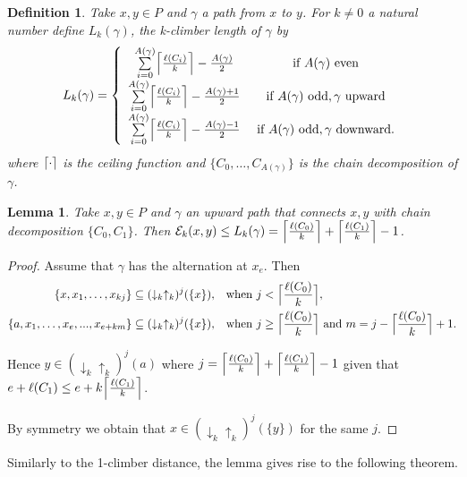 \documentclass{article}[12pt]
\theoremstyle{exampstyle}
\newtheorem{definition}[theorem]{Definition}
\newtheorem{lemma}[theorem]{Lemma}
\theoremstyle{remark}
\newcommand{\E}{\mathcal{E}}
\newcommand{\updown}[1][]{\downarrow_{#1} \uparrow_{#1}}
\DeclarePairedDelimiter{\ceil}{\lceil}{\rceil}
\newcommand{\myceil}[2][k]{\ceil[\Big]{\frac{#2 }{#1}}}
\newcommand{\tuple}[3][1]{#2_{#1}, \dots , #2_{#3}}
\begin{document}
\begin{definition}
    Take $x,y \in P$ and $\gamma$ a path from $x$ to $y$. For $k \neq 0$ a natural number define $L_k(\gamma)$, the \textit{k-climber length} of $\gamma$ by 
    \begin{equation*}
        L_k(\gamma) = \left\{ 
        \begin{array}{cc}
            \sum\limits_{i=0}^{A(\gamma)} \myceil{\ell(C_i)}- \frac{A(\gamma)}{2} &  \text{ if } A(\gamma) \text{ even} \\
            \sum\limits_{i=0}^{A(\gamma)} \myceil{\ell(C_i)}- \frac{A(\gamma)+1}{2} &  \text{ if } A(\gamma) \text{ odd}, \gamma \text{ upward}\\
            \sum\limits_{i=0}^{A(\gamma)} \myceil{\ell(C_i)}- \frac{A(\gamma)-1}{2} &  \text{ if } A(\gamma) \text{ odd}, \gamma \text{ downward}.\\
        \end{array}
        \right.
    \end{equation*}
    where $\ceil{\cdot}$ is the ceiling function and $\{\tuple[0]{C}{A(\gamma)}\}$ is the chain decomposition of $\gamma$.
\end{definition}

\begin{lemma}
    Take $x,y \in P $ and $\gamma$ an upward path that connects $x,y$ with chain decomposition $\{C_0,C_1\}$. Then $\E_k(x,y) \leq L_k({\gamma}) = \myceil{\ell(C_0)} + \myceil{\ell(C_1)} -  1$. 
    \label{lemma_k-k_one}
\end{lemma}
\begin{proof}
    Assume that $\gamma$ has the alternation at $x_e$. Then
    \begin{align*}
        \{ x, \tuple[1]{x}{kj}\} \subseteq (\updown[k])^{j}(\{x\}), & \quad  \text{when } j < \myceil{\ell(C_0)}, \\
         \{ a, \tuple[1]{x}{e}, ..., x_{e + km}\} \subseteq (\updown[k])^{j}(\{x\}), & \quad  \text{when } j \geq \myceil{\ell(C_0)}  \text{ and } m = j - \myceil{\ell(C_0)} + 1.
    \end{align*}
    
    Hence $y \in (\updown[k])^{j}(a)$ where $j = \myceil{\ell(C_0)} + \myceil{\ell(C_1)} -  1$ given that $e + \ell(C_1)  \leq e + k\myceil{\ell(C_1)}$.
    
   By symmetry we obtain that $x \in (\updown[k])^{j}(\{y\})$ for the same $j$. 
\end{proof}

Similarly to the 1-climber distance, the lemma gives rise to the following theorem.
\end{document}
